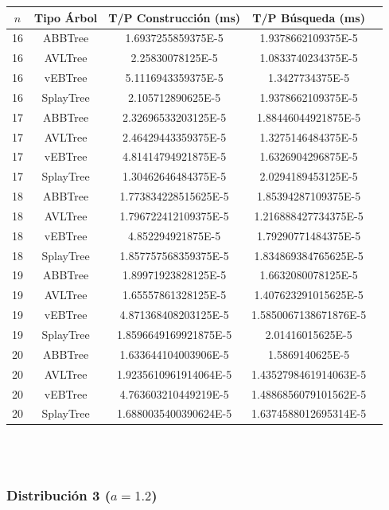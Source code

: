 \documentclass[letterpaper,12pt]{article}
\begin{document}
\begin{tabular}{|c|c|c|c|c|}
\hline
\textbf{$n$} & \textbf{Tipo Árbol} & \textbf{T/P Construcción (ms)} & \textbf{T/P Búsqueda (ms)} \\
\hline
16 & ABBTree & 1.6937255859375E-5 & 1.9378662109375E-5 \\
\hline
16 & AVLTree & 2.25830078125E-5 & 1.0833740234375E-5 \\
\hline
16 & vEBTree & 5.1116943359375E-5 & 1.3427734375E-5 \\
\hline
16 & SplayTree & 2.105712890625E-5 & 1.9378662109375E-5 \\
\hline
\hline
17 & ABBTree & 2.32696533203125E-5  & 1.88446044921875E-5 \\
\hline
17 & AVLTree & 2.46429443359375E-5 & 1.3275146484375E-5 \\
\hline
17 & vEBTree & 4.81414794921875E-5  & 1.6326904296875E-5\\
\hline
17 & SplayTree & 1.30462646484375E-5 & 2.0294189453125E-5 \\
\hline
\hline
18 & ABBTree & 1.773834228515625E-5 & 1.85394287109375E-5 \\
\hline
18 & AVLTree & 1.796722412109375E-5 & 1.216888427734375E-5 \\
\hline
18 & vEBTree & 4.852294921875E-5 & 1.79290771484375E-5 \\
\hline
18 & SplayTree & 1.857757568359375E-5  & 1.834869384765625E-5 \\
\hline
\hline
19 & ABBTree & 1.89971923828125E-5 & 1.6632080078125E-5 \\
\hline
19 & AVLTree & 1.65557861328125E-5  & 1.407623291015625E-5 \\
\hline
19 & vEBTree & 4.871368408203125E-5 & 1.5850067138671876E-5\\
\hline
19 & SplayTree & 1.8596649169921875E-5 & 2.01416015625E-5 \\
\hline
\hline
20 & ABBTree & 1.633644104003906E-5 & 1.5869140625E-5 \\
\hline
20 & AVLTree & 1.9235610961914064E-5 & 1.4352798461914063E-5 \\
\hline
20 & vEBTree & 4.763603210449219E-5 & 1.4886856079101562E-5\\
\hline
20 & SplayTree & 1.6880035400390624E-5 & 1.6374588012695314E-5 \\
\hline
\end{tabular}
\\ \\

\subsubsection{Distribución 3 ($a=1.2$)}
\end{document}
